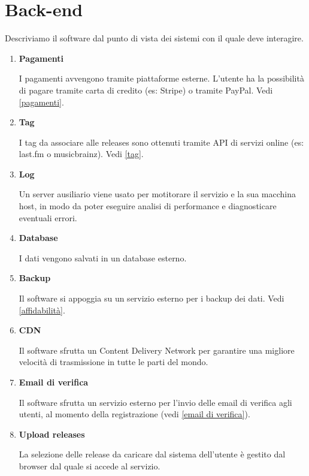 \documentclass[a4paper,12pt]{article}
\begin{document}
\section{Back-end}

Descriviamo il software dal punto di vista dei sistemi con il quale deve interagire.

\begin{enumerate}[label=\textbf{BE\arabic*}\;, ref=\textbf{BE\arabic*}]
    \item \label{pagamenti} \textbf{Pagamenti}
    
    I pagamenti avvengono tramite piattaforme esterne. L'utente ha la possibilità di pagare tramite carta di credito (es: Stripe) o tramite PayPal. Vedi \ref{pagamenti}.
    \item \label{tag backend} \textbf{Tag}
    
    I tag da associare alle releases sono ottenuti tramite API di servizi online (es: last.fm o musicbrainz). Vedi \ref{tag}.
    \item \label{log} \textbf{Log}
    
    Un server ausiliario viene usato per motitorare il servizio e la sua macchina host, in modo da poter eseguire analisi di performance e diagnosticare eventuali errori.
    \item \label{database} \textbf{Database}
    
    I dati vengono salvati in un database esterno.
    \item \label{backup} \textbf{Backup}
    
    Il software si appoggia su un servizio esterno per i backup dei dati. Vedi \ref{affidabilità}.
    \item \label{CDN} \textbf{CDN}
    
    Il software sfrutta un Content Delivery Network per garantire una migliore velocità di trasmissione in tutte le parti del mondo.
    \item \label{backend email di verifica} \textbf{Email di verifica}
    
    Il software sfrutta un servizio esterno per l'invio delle email di verifica agli utenti, al momento della registrazione (vedi \ref{email di verifica}).
    \item \label{upload releases} \textbf{Upload releases}
    
    La selezione delle release da caricare dal sistema dell'utente è gestito dal browser dal quale si accede al servizio.
\end{enumerate}
\end{document}
